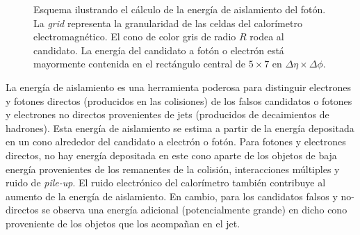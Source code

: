 





\begin{figure}[!h]
  \centering

  \resizebox{0.5\textwidth}{!}{
    
  }

  \caption{Esquema ilustrando el cálculo de la energía de aislamiento del fotón. La \emph{grid} representa
    la granularidad de las celdas del calorímetro electromagnético. El
    cono de color gris de radio $R$ rodea al candidato. La energía del candidato a fotón o electrón
    está mayormente contenida en el rectángulo central de $5 \times 7$ en $\Delta\eta \times \Delta\phi$. }
  \label{fig:topoetcone}

\end{figure}


La energía de aislamiento es una herramienta poderosa para distinguir electrones
y fotones directos (producidos en las colisiones) de los falsos candidatos o
fotones y electrones no directos provenientes de jets (producidos de
decaimientos de hadrones). Esta energía de aislamiento se estima a partir de la energía depositada en un
cono alrededor del candidato a electrón o fotón. Para fotones y electrones
directos, no hay energía depositada en este cono aparte de los objetos de baja
energía provenientes de los remanentes de la colisión, interacciones múltiples y
ruido de \emph{pile-up}. El ruido electrónico del calorímetro también contribuye al
aumento de la energía de aislamiento.
En cambio, para los candidatos falsos y no-directos se observa una energía adicional
(potencialmente grande) en dicho cono proveniente de los objetos que los acompañan en el jet.

